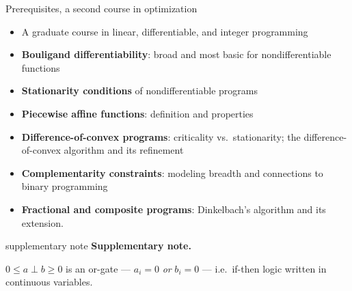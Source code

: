 \documentclass[aspectratio=169,xcolor=dvipsnames]{beamer}
\newenvironment{supplementarynote}{%
  \vspace{0.08cm}%
  \begin{beamercolorbox}[
    wd=\textwidth,sep=0.08cm,leftskip=0.08cm,rightskip=0.08cm
  ]{supplementary note}%
  \footnotesize
  \textcolor{SupplementAccent}{\textbf{Supplementary note.}}\enspace
}{%
  \end{beamercolorbox}%
}
\begin{document}
\begin{frame}{Prerequisites, a second course in optimization}
  \small
  \setlength{\parskip}{0pt}
  \begin{itemize}
    \setlength{\itemsep}{0.16cm}
    \item \textcolor{MediumRed}{A graduate course in linear, differentiable,
      and integer programming}
    \item \textbf{Bouligand differentiability}: broad and most basic for
      nondifferentiable functions
    \item \textbf{Stationarity conditions} of nondifferentiable programs
    \item \textbf{Piecewise affine functions}: definition and properties
    \item \textbf{Difference-of-convex programs}: criticality vs.\
      stationarity; the difference-of-convex algorithm and its refinement
    \item \textbf{Complementarity constraints}: modeling breadth and
      connections to binary programming
    \item \textbf{Fractional and composite programs}: Dinkelbach's algorithm
      and its extension.
  \end{itemize}

  \begin{supplementarynote}
    $0\leq a\perp b\geq0$ is an or-gate --- $a_i=0$ \emph{or} $b_i=0$ ---
    i.e.\ if-then logic written in continuous variables.
  \end{supplementarynote}
\end{frame}
\end{document}
